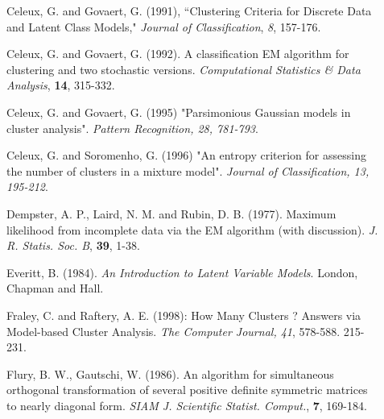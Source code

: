 \begin{description}
\item[    ] Celeux, G. and Govaert, G. (1991), ``Clustering Criteria for Discrete
Data and Latent Class Models," {\em Journal of Classification}, {\em 8}, 157-176.
\item[    ] Celeux, G. and Govaert, G. (1992). A classification EM
algorithm for clustering and two stochastic versions. {\em
Computational Statistics \& Data Analysis}, {\bf 14}, 315-332.
\item[    ]  Celeux, G. and Govaert, G. (1995) "Parsimonious Gaussian models in cluster analysis". {\em Pattern Recognition, 28, 781-793}.
\item[    ] Celeux, G. and Soromenho, G. (1996) "An entropy criterion for assessing the number of clusters in a mixture model". {\em Journal of Classification, 13, 195-212}.
\item[    ] Dempster, A. P., Laird, N. M. and Rubin, D. B. (1977). Maximum likelihood from incomplete data via the EM algorithm (with discussion). {\em J. R. Statis. Soc. B}, {\bf 39}, 1-38.
\item[    ] Everitt, B. (1984). {\em An Introduction to Latent Variable Models}. London,
Chapman and Hall.
\item[    ] Fraley, C. and Raftery, A. E. (1998): How Many Clusters ? Answers
via Model-based Cluster Analysis. {\em The Computer Journal, 41}, 578-588.
215-231.
\item[    ] Flury, B. W., Gautschi, W. (1986). An algorithm for simultaneous orthogonal transformation of several positive
definite symmetric matrices to nearly diagonal form. {\em SIAM J. Scientific Statist. Comput.}, {\bf 7}, 169-184.

\end{description}

